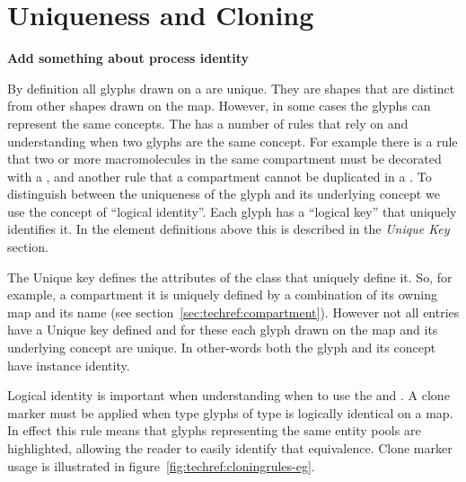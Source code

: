 \section{Uniqueness and Cloning}
\label{sec:techref:epnuniqueness}
\label{sec:techref:uniquenessdefinition}

\textbf{Add something about process identity}

By definition all glyphs drawn on a \PDl are unique. They are shapes
that are distinct from other shapes drawn on the map. However, in some
cases the glyphs can represent the same concepts. The \PDl has a
number of rules that rely on and understanding when two glyphs are the
same concept. For example there is a rule that two or more
macromolecules in the same compartment must be decorated with a
, and another rule that a compartment cannot be
duplicated in a \PDm.  To distinguish between the uniqueness of the
glyph and its underlying concept we use the concept of ``logical
identity''. Each glyph has a ``logical key'' that uniquely identifies
it. In the element definitions above this is described in the
\emph{Unique Key} section.

The Unique key defines the attributes of the class that uniquely
define it.  So, for example, a compartment it is uniquely defined by a
combination of its owning map and its name (see
section~\ref{sec:techref:compartment}). However not all entries have a
Unique key defined and for these each glyph drawn on the map and its
underlying concept are unique. In other-words both the glyph and its
concept have instance identity.

Logical identity is important when understanding when to use the
 and . A clone
marker must be applied when type glyphs of type 
is logically identical on a map. In effect this rule means that glyphs
representing the same entity pools are highlighted, allowing the reader
to easily identify that equivalence.  Clone marker usage is
illustrated in figure~\ref{fig:techref:cloningrules-eg}.




